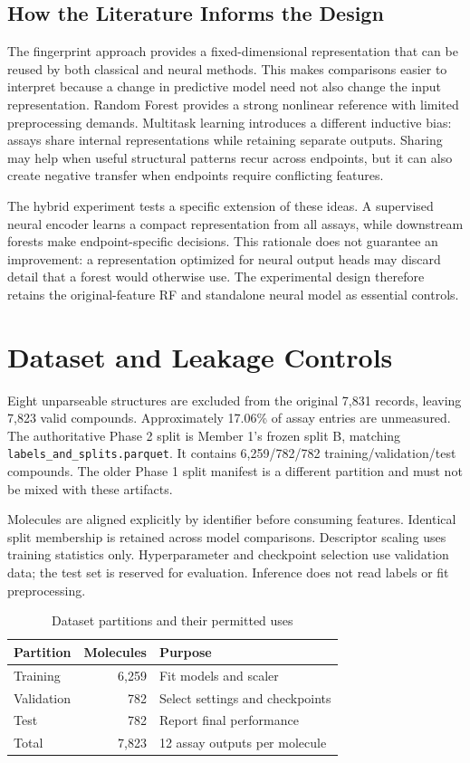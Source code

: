 \documentclass[11pt,a4paper]{article}\usepackage[margin=25mm]{geometry}\usepackage{fancyhdr}\usepackage{setspace}\usepackage{titlesec}\usepackage{xcolor}
\begin{document}
\subsection{How the Literature Informs the Design}
The fingerprint approach provides a fixed-dimensional representation that can be reused by both classical and neural methods. This makes comparisons easier to interpret because a change in predictive model need not also change the input representation. Random Forest provides a strong nonlinear reference with limited preprocessing demands. Multitask learning introduces a different inductive bias: assays share internal representations while retaining separate outputs. Sharing may help when useful structural patterns recur across endpoints, but it can also create negative transfer when endpoints require conflicting features.

The hybrid experiment tests a specific extension of these ideas. A supervised neural encoder learns a compact representation from all assays, while downstream forests make endpoint-specific decisions. This rationale does not guarantee an improvement: a representation optimized for neural output heads may discard detail that a forest would otherwise use. The experimental design therefore retains the original-feature RF and standalone neural model as essential controls.


\section{Dataset and Leakage Controls}
Eight unparseable structures are excluded from the original 7,831 records, leaving 7,823 valid compounds. Approximately 17.06\% of assay entries are unmeasured. The authoritative Phase 2 split is Member 1's frozen split B, matching \texttt{labels\_and\_splits.parquet}. It contains 6,259/782/782 training/validation/test compounds. The older Phase 1 split manifest is a different partition and must not be mixed with these artifacts.

Molecules are aligned explicitly by identifier before consuming features. Identical split membership is retained across model comparisons. Descriptor scaling uses training statistics only. Hyperparameter and checkpoint selection use validation data; the test set is reserved for evaluation. Inference does not read labels or fit preprocessing.

\begin{table}[t]
\caption{Dataset partitions and their permitted uses}
\label{tab:data}\centering
\begin{tabular}{lrl}\toprule
Partition & Molecules & Purpose\\\midrule
Training & 6,259 & Fit models and scaler\\
Validation & 782 & Select settings and checkpoints\\
Test & 782 & Report final performance\\\midrule
Total & 7,823 & 12 assay outputs per molecule\\\bottomrule
\end{tabular}
\end{table}
\end{document}
